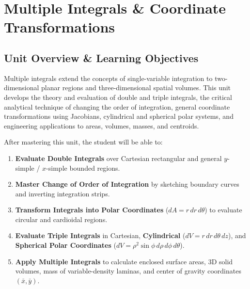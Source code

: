 \chapter{Multiple Integrals \& Coordinate Transformations}
\label{chap:multiple-integrals}

\section{Unit Overview \& Learning Objectives}

Multiple integrals extend the concepts of single-variable integration to two-dimensional planar regions and three-dimensional spatial volumes. This unit develops the theory and evaluation of double and triple integrals, the critical analytical technique of changing the order of integration, general coordinate transformations using Jacobians, cylindrical and spherical polar systems, and engineering applications to areas, volumes, masses, and centroids.

\begin{important}
After mastering this unit, the student will be able to:
\begin{enumerate}[leftmargin=1.5em]
    \item \textbf{Evaluate Double Integrals} over Cartesian rectangular and general $y$-simple / $x$-simple bounded regions.
    \item \textbf{Master Change of Order of Integration} by sketching boundary curves and inverting integration strips.
    \item \textbf{Transform Integrals into Polar Coordinates} ($dA = r\,dr\,d\theta$) to evaluate circular and cardioidal regions.
    \item \textbf{Evaluate Triple Integrals} in Cartesian, \textbf{Cylindrical} ($dV = r\,dr\,d\theta\,dz$), and \textbf{Spherical Polar Coordinates} ($dV = \rho^2\sin\phi\,d\rho\,d\phi\,d\theta$).
    \item \textbf{Apply Multiple Integrals} to calculate enclosed surface areas, 3D solid volumes, mass of variable-density laminas, and center of gravity coordinates $(\bar{x}, \bar{y})$.
\end{enumerate}
\end{important}


